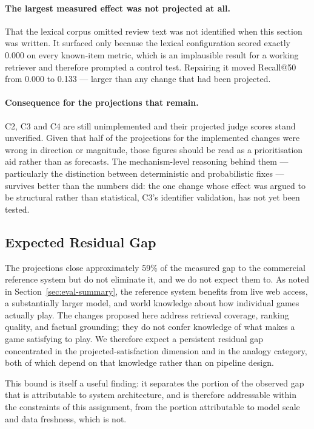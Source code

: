 \paragraph{The largest measured effect was not projected at all.}
That the lexical corpus omitted review text was not identified when this section
was written. It surfaced only because the lexical configuration scored exactly
0.000 on every known-item metric, which is an implausible result for a working
retriever and therefore prompted a control test. Repairing it moved Recall@50
from 0.000 to 0.133 --- larger than any change that had been projected.

\paragraph{Consequence for the projections that remain.}
C2, C3 and C4 are still unimplemented and their projected judge scores stand
unverified. Given that half of the projections for the implemented changes were
wrong in direction or magnitude, those figures should be read as a
prioritisation aid rather than as forecasts. The mechanism-level reasoning
behind them --- particularly the distinction between deterministic and
probabilistic fixes --- survives better than the numbers did: the one change
whose effect was argued to be structural rather than statistical, C3's
identifier validation, has not yet been tested.

\subsection{Expected Residual Gap}
\label{sec:residual-gap}

The projections close approximately 59\% of the measured gap to the commercial
reference system but do not eliminate it, and we do not expect them to. As noted
in Section~\ref{sec:eval-summary}, the reference system benefits from live web
access, a substantially larger model, and world knowledge about how individual
games actually play. The changes proposed here address retrieval coverage,
ranking quality, and factual grounding; they do not confer knowledge of what
makes a game satisfying to play. We therefore expect a persistent residual gap
concentrated in the projected-satisfaction dimension and in the analogy
category, both of which depend on that knowledge rather than on pipeline
design.

This bound is itself a useful finding: it separates the portion of the observed
gap that is attributable to system architecture, and is therefore addressable
within the constraints of this assignment, from the portion attributable to
model scale and data freshness, which is not.

